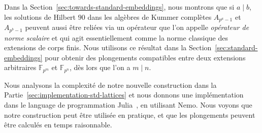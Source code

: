 Dans la Section~\ref{sec:towards-standard-embeddings}, nous montrons que si
$a\mid b$, les solutions de Hilbert $90$ dans les algèbres de Kummer complètes
$A_{p^a-1}$ et $A_{p^b-1}$ peuvent aussi être reliées via un opérateur que l'on
appelle \emph{opérateur de norme scalaire} et qui agit essentiellement comme la
norme classique des extensions de corps finis. Nous utilisons ce résultat dans
la Section~\ref{sec:standard-embeddings} pour obtenir des plongements
compatibles entre deux extensions arbitraires $\mathbb{F}_{p^m}$ et
$\mathbb{F}_{p^{n}}$, dès lors que l'on a $m\mid n$.

Nous analysons la complexité de notre nouvelle construction dans la
Partie~\ref{sec:implementation-std-lattices} et nous donnons une implémentation
dans le language de programmation Julia~\cite{Julia}, en utilisant Nemo. Nous
voyons que notre construction peut être utilisée en pratique, et que les
plongements peuvent être calculés en temps raisonnable.
